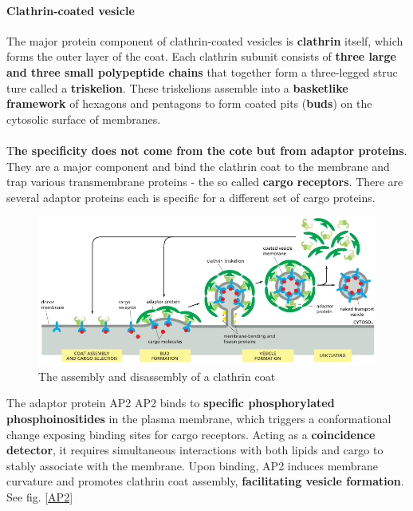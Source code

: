 \documentclass[../main.tex]{subfiles}
\begin{document}
\paragraph{Clathrin-coated vesicle}
The major protein component of clathrin-coated vesicles is \textbf{clathrin} itself, which forms the outer layer of the coat. Each clathrin subunit consists of \textbf{three large and three small polypeptide chains} that together form a three-legged struc ture called a \textbf{triskelion}. These triskelions assemble into a \textbf{basketlike framework} of hexagons and pentagons to form coated pits (\textbf{buds}) on the cytosolic surface of membranes. \\
\\

T\textbf{he specificity does not come from the cote but from adaptor proteins}. They are a major component and bind the clathrin coat to the membrane and trap various transmembrane proteins - the so called \textbf{cargo receptors}. There are several adaptor proteins each is specific for a different set of cargo proteins. 

\begin{figure}[H]
	\centering
	\includegraphics[width= \textwidth]{7}
	\caption{The assembly and disassembly of a clathrin coat}
\end{figure}


\begin{ExWithTitle}{The adaptor protein AP2}
	\gls{AP2} binds to \textbf{specific phosphorylated phosphoinositides} in the plasma membrane, which triggers a conformational change exposing binding sites for cargo receptors. Acting as a \textbf{coincidence detector}, it requires simultaneous interactions with both lipids and cargo to stably associate with the membrane. Upon binding, AP2 induces membrane curvature and promotes clathrin coat assembly, \textbf{facilitating vesicle formation}. See fig. \ref{AP2} 
\end{ExWithTitle}
\end{document}
